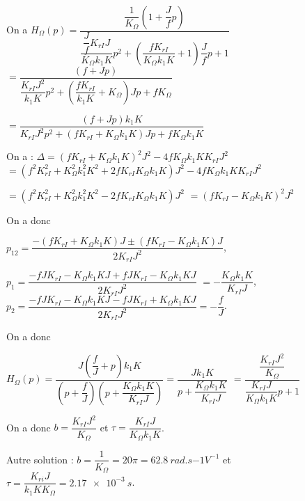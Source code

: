 
\ifprof
\begin{corrige}~\\

\footnotesize

On a 
$H_{\Omega}(p)=\dfrac{\dfrac{1}{K_{\Omega}}\left( 1 + \dfrac{J}{f}p \right)}{\dfrac{\dfrac{J}{f} K_{rI}J}{K_{\Omega}k_{1}K}p^2+\left(\dfrac{f K_{rI}}{K_{\Omega}k_{1}K}+1\right)\dfrac{J}{f}p + 1 }$
$=\dfrac{\left( f + Jp \right)}{\dfrac{ K_{rI}J^2}{k_{1}K}p^2+\left(\dfrac{f K_{rI}}{k_{1}K}+K_{\Omega}\right)Jp + fK_{\Omega}}$

$=\dfrac{\left( f + Jp \right)k_{1}K}{ K_{rI}J^2p^2+\left(f K_{rI}+K_{\Omega}k_{1}K\right)Jp + fK_{\Omega}k_{1}K}$


On a :
$\Delta =\left(f K_{rI}+K_{\Omega}k_{1}K\right)^2J^2 -4 fK_{\Omega}k_{1}KK_{rI}J^2 $ 
$=\left(f^2 K_{rI}^2+K_{\Omega}^2k_{1}^2K^2+2f K_{rI}K_{\Omega}k_{1}K\right)J^2 -4 fK_{\Omega}k_{1}KK_{rI}J^2 $

$=\left(f^2 K_{rI}^2+K_{\Omega}^2k_{1}^2K^2-2f K_{rI}K_{\Omega}k_{1}K\right)J^2  $
$=\left(f K_{rI}-K_{\Omega}k_{1}K\right)^2J^2  $

On a donc 

$p_{12} = \dfrac{-\left(f K_{rI}+K_{\Omega}k_{1}K\right)J \pm \left(f K_{rI}-K_{\Omega}k_{1}K\right)J}{2 K_{rI}J^2}$, 

$p_{1} = \dfrac{-fJ K_{rI}-K_{\Omega}k_{1}KJ + fJ K_{rI}-K_{\Omega}k_{1}KJ}{2 K_{rI}J^2}$
$= -\dfrac{K_{\Omega}k_{1}K }{ K_{rI}J}$, 
$p_{2} = \dfrac{-fJ K_{rI}-K_{\Omega}k_{1}KJ -fJ K_{rI}+K_{\Omega}k_{1}KJ}{2 K_{rI}J^2}= -\dfrac{f }{J}$.

On a donc 

$H_{\Omega}(p)=\dfrac{J\left( \dfrac{f}{J} + p \right)k_{1}K}{\left(p+\dfrac{f }{J} \right)\left(p+\dfrac{K_{\Omega}k_{1}K }{ K_{rI}J} \right)}=\dfrac{Jk_{1}K}{p+\dfrac{K_{\Omega}k_{1}K }{ K_{rI}J} }$
$=\dfrac{\dfrac{ K_{rI}J^2}{K_{\Omega} } }{\dfrac{ K_{rI}J}{K_{\Omega}k_{1}K }p+1 }$

On a donc $b=\dfrac{ K_{rI}J^2}{K_{\Omega} }$ et $\tau =\dfrac{ K_{rI}J}{K_{\Omega}k_{1}K }$.

\normalsize
Autre solution : $b=\dfrac{1}{K_{\Omega}} = 20 \pi = \SI{62,8}{rad.s{-1}V^{-1}}$ et $\tau=\dfrac{K_{ri}J}{k_1KK_{\Omega}}=\SI{2,17e-3}{s}$.


\end{corrige}
\else
\fi

